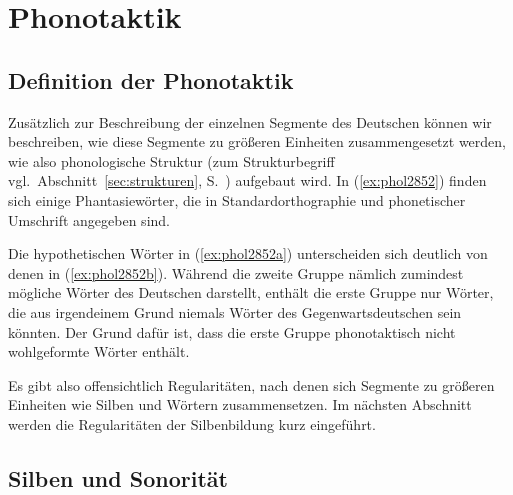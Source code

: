 \section{Phonotaktik}

\label{sec:phonotaktik}

\subsection{Definition der Phonotaktik}

Zusätzlich zur Beschreibung der einzelnen Segmente des Deutschen können wir beschreiben, wie diese Segmente zu größeren Einheiten zusammengesetzt werden, wie also phonologische Struktur (zum Strukturbegriff vgl.\ Abschnitt~\ref{sec:strukturen}, S.~\pageref{sec:strukturen}) aufgebaut wird.
In (\ref{ex:phol2852}) finden sich einige Phantasiewörter, die in Standardorthographie und phonetischer Umschrift angegeben sind.

\begin{exe}
  \ex\label{ex:phol2852}
  \begin{xlist}
  \end{xlist}
\end{exe}

Die hypothetischen Wörter in (\ref{ex:phol2852a}) unterscheiden sich deutlich von denen in (\ref{ex:phol2852b}).
Während die zweite Gruppe nämlich zumindest mögliche Wörter des Deutschen darstellt, enthält die erste Gruppe nur Wörter, die aus irgendeinem Grund niemals Wörter des Gegenwartsdeutschen sein könnten.
Der Grund dafür ist, dass die erste Gruppe phonotaktisch nicht wohlgeformte Wörter enthält.


Es gibt also offensichtlich Regularitäten, nach denen sich Segmente zu größeren Einheiten wie Silben und Wörtern zusammensetzen.
Im nächsten Abschnitt werden die Regularitäten der Silbenbildung kurz eingeführt.

\subsection{Silben und Sonorität}

